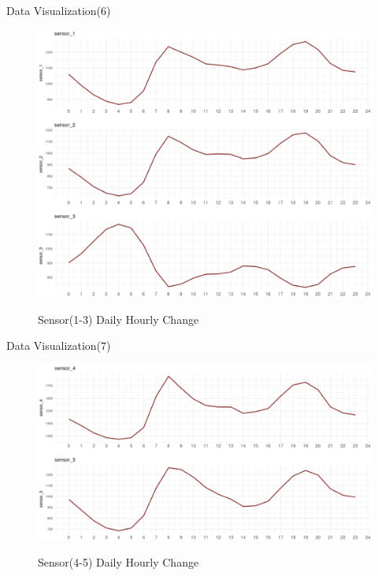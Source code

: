 \documentclass[
 size=14pt,
 paper=smartboard,  %
 mode=present, 		%
 display=slides, 	%
 style=tuliplab,  	%
 pauseslide,
 fleqn,leqno]{powerdot}
\begin{document}
\begin{slide}[toc=,bm=]{Data Visualization(6)}
	
	\begin{figure}
		\centering
        \includegraphics[scale=0.3]{figures//p6.eps}\\
		\caption{Sensor(1-3) Daily Hourly Change}\label{fig:Sensor(1-3) Daily Hourly Change}
	\end{figure}
	
\end{slide}

\begin{slide}[toc=,bm=]{Data Visualization(7)}
	
	\begin{figure}
		\centering
        \includegraphics[scale=0.35]{figures//p7.eps}\\
		\caption{Sensor(4-5) Daily Hourly Change}\label{fig:Sensor(4-5) Daily Hourly Change}
	\end{figure}
	
\end{slide}
\end{document}
